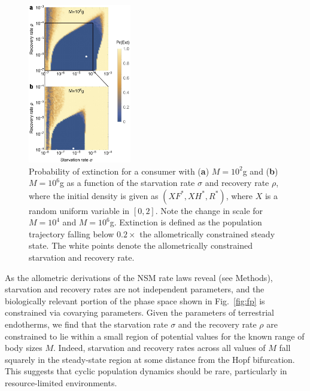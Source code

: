 \documentclass[twocolumn,preprintnumbers,amsmath,amssymb,superscriptaddress]{revtex4}
\begin{document}
\begin{figure}
\centering
\includegraphics[width=0.4\textwidth]{fig_ExtinctionAllometricComb4.eps}
\caption{\small{ Probability of extinction for a consumer with ({\bf a}) $M=10^2$g and ({\bf b}) $M=10^6$g as a function of the starvation rate $\sigma$ and recovery rate $\rho$, where the initial density is given as $(XF^*,XH^*,R^*)$, where $X$ is a random uniform variable in $[0,2]$. Note the change in scale for $M=10^4$ and $M=10^6$g.  Extinction is defined as the population trajectory falling below $0.2\times$ the allometrically constrained steady state. The white points denote the allometrically constrained starvation and recovery rate.}\label{fig:ext}}
\end{figure}

As the allometric derivations of the NSM rate laws reveal (see Methods),
starvation and recovery rates are not independent parameters, and the
biologically relevant portion of the phase space shown in Fig.~\ref{fig:fp}
is constrained via covarying parameters.  Given the parameters of terrestrial
endotherms, we find that the starvation rate $\sigma$ and the recovery rate
$\rho$ are constrained to lie within a small region of potential values for
the known range of body sizes $M$.  Indeed, starvation and recovery rates
across all values of $M$ fall squarely in the steady-state region at some
distance from the Hopf bifurcation.  This suggests that cyclic population
dynamics should be rare, particularly in resource-limited environments.
\end{document}
